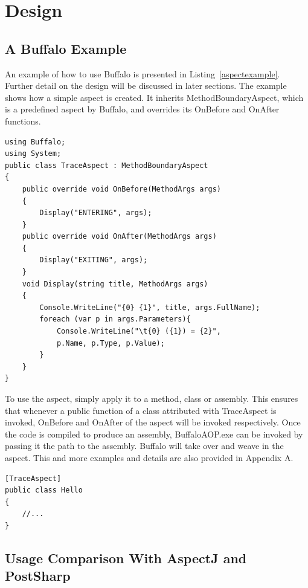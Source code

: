 \chapter{Design}

\section{A Buffalo Example}

An example of how to use Buffalo is presented in Listing~\ref{aspectexample}. Further detail on the design will be discussed in later sections. The example shows how a simple aspect is created. It inherits MethodBoundaryAspect, which is a predefined aspect by Buffalo, and overrides its OnBefore and OnAfter functions.

\begin{minipage}{\textwidth}
\begin{lstlisting}[caption={Sample TraceAspect}, label=aspectexample]
using Buffalo;
using System;
public class TraceAspect : MethodBoundaryAspect
{
    public override void OnBefore(MethodArgs args)
    {
        Display("ENTERING", args);
    }
    public override void OnAfter(MethodArgs args)
    {
        Display("EXITING", args);
    }
    void Display(string title, MethodArgs args)
    {
        Console.WriteLine("{0} {1}", title, args.FullName);
        foreach (var p in args.Parameters){
            Console.WriteLine("\t{0} ({1}) = {2}", 
			p.Name, p.Type, p.Value);
        }
    }
}
\end{lstlisting}
\end{minipage}

To use the aspect, simply apply it to a method, class or assembly. This ensures that whenever a public function of a class attributed with TraceAspect is invoked, OnBefore and OnAfter of the aspect will be invoked respectively. Once the code is compiled to produce an assembly, BuffaloAOP.exe can be invoked by passing it the path to the assembly. Buffalo will take over and weave in the aspect. This and more examples and details are also provided in Appendix A.

\begin{minipage}{\textwidth}
\begin{lstlisting}[caption={Apply Aspect on Class Level}, label=helloaspect]
[TraceAspect]
public class Hello
{
    //...
}
\end{lstlisting}
\end{minipage}

\section{Usage Comparison With AspectJ and PostSharp}

